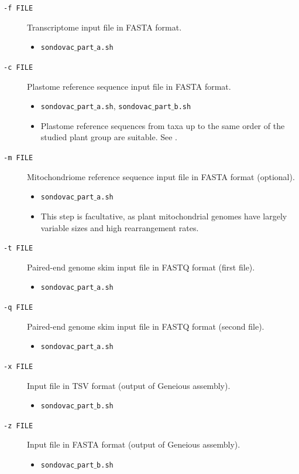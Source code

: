\documentclass[a4paper, 11pt, twoside]{article}
\begin{document}
\begin{description}
\item[\texttt{-f FILE}] Transcriptome input file in FASTA format.
  \begin{itemize}
    \item \texttt{sondovac$\_$part$\_$a.sh}
  \end{itemize}
\item[\texttt{-c FILE}] Plastome reference sequence input file in FASTA format.
  \begin{itemize}
    \item \texttt{sondovac$\_$part$\_$a.sh}, \texttt{sondovac$\_$part$\_$b.sh}
    \item Plastome reference sequences from taxa up to the same order of the studied plant group are suitable. See \citet{Straub2012}.
  \end{itemize}
\item[\texttt{-m FILE}] Mitochondriome reference sequence input file in FASTA format (optional).
  \begin{itemize}
    \item \texttt{sondovac$\_$part$\_$a.sh}
    \item This step is facultative, as plant mitochondrial genomes have largely variable sizes and high rearrangement rates.
  \end{itemize}
\item[\texttt{-t FILE}] Paired-end genome skim input file in FASTQ format (first file).
  \begin{itemize}
    \item \texttt{sondovac$\_$part$\_$a.sh}
  \end{itemize}
\item[\texttt{-q FILE}] Paired-end genome skim input file in FASTQ format (second file).
  \begin{itemize}
    \item \texttt{sondovac$\_$part$\_$a.sh}
  \end{itemize}
\item[\texttt{-x FILE}] Input file in TSV format (output of Geneious assembly).
  \begin{itemize}
    \item \texttt{sondovac$\_$part$\_$b.sh}
  \end{itemize}
\item[\texttt{-z FILE}] Input file in FASTA format (output of Geneious assembly).
  \begin{itemize}
    \item \texttt{sondovac$\_$part$\_$b.sh}
  \end{itemize}
\end{description}
\end{document}
